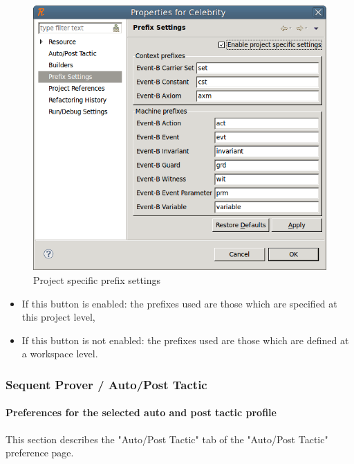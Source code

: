 \begin{figure}[!h]
\begin{center}
	\includegraphics{img/reference/ref_01_preferences2.png}
	\caption{Project specific prefix settings}
	\label{fig_ref_01_preferences2}
\end{center}
\end{figure}

\begin{itemize}
	\item If this button is enabled: the prefixes used are those which are specified at this project level, 
	\item If this button is not enabled: the prefixes used are those which are defined at a workspace level. 
\end{itemize}

\subsubsection{Sequent Prover / Auto/Post Tactic}
\label{ref_01_preferences_auto_post_tactic}

\paragraph{Preferences for the selected auto and post tactic profile}

This section describes the "Auto/Post Tactic" tab of the "Auto/Post Tactic" preference page.

